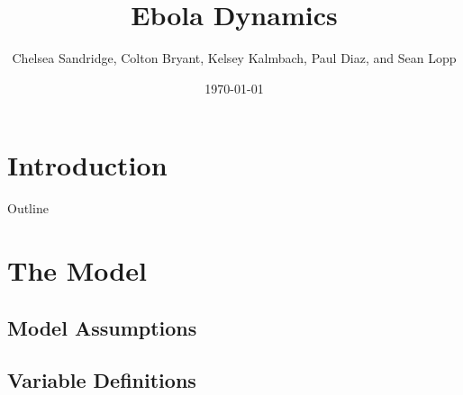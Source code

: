 \documentclass{beamer}
\title[Ebola Dynamics]{Ebola Dynamics}
\author{Chelsea Sandridge, Colton Bryant, Kelsey Kalmbach, Paul Diaz, and Sean Lopp}
\institute{Colorado School of Mines}
\date{\today}
\begin{document}
\section{Introduction}

\begin{frame}
  \titlepage
\end{frame}

\begin{frame}{Outline}
   \tableofcontents
\end{frame}


\section{The Model}

\subsection{Model Assumptions}




\subsection{Variable Definitions}

\end{document}
